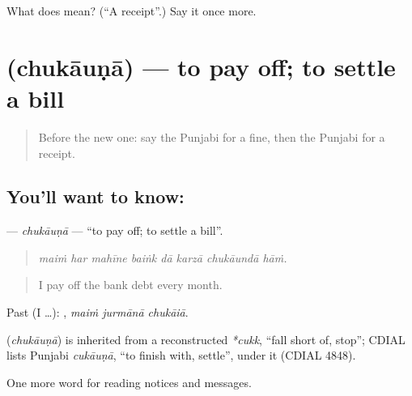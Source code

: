 \begin{tcolorbox}[breakable,colback=teal!4,colframe=teal!35!black,title={Before you move on}]
What does  mean? (\textquotedblleft{}A receipt\textquotedblright{}.) Say it once more.
\end{tcolorbox}
\section[\texorpdfstring{\pa{ਚੁਕਾਉਣਾ} (chukāuṇā)}{ਚੁਕਾਉਣਾ (chukāuṇā)}]{ (chukāuṇā) — to pay off; to settle a bill}

\label{lesson:PA-C262-chukauna}



\begin{quote}
Before the new one: say the Punjabi for a fine, then the Punjabi for a receipt.
\end{quote}

\subsection*{You'll want to know: }
\textbf{} — \emph{chukāuṇā} — \textquotedblleft{}to pay off; to settle a bill\textquotedblright{}.

\begin{quote}
       
\end{quote}

\begin{quote}
\emph{maiṁ har mahīne baiṅk dā karzā chukāundā hāṁ.}
\end{quote}

\begin{quote}
I pay off the bank debt every month.
\end{quote}

Past (I …):   , \emph{maiṁ jurmānā chukāiā}.

\begin{cousinweb}
\textbf{} (\emph{chukāuṇā}) is inherited from a reconstructed \emph{*cukk}, \textquotedblleft{}fall short of, stop\textquotedblright{}; CDIAL lists Punjabi \emph{cukāuṇā}, \textquotedblleft{}to finish with, settle\textquotedblright{}, under it (CDIAL 4848).
\end{cousinweb}

\begin{grammarlens}[title={What you've built}]
One more word for reading notices and messages.
\end{grammarlens}

